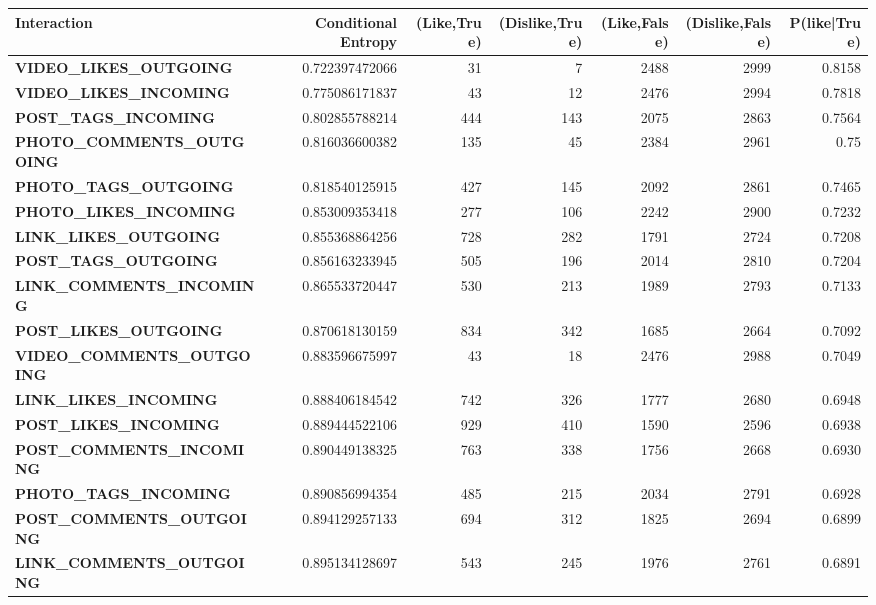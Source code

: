 \begin{table}
	\centering
	\begin{tabular}{| >{\small}l | >{\small}r | >{\small}r | >{\small}r | >{\small}r | >{\small}r | >{\small}r |}
	\hline
	Interaction & Conditional Entropy & (Like,True) & (Dislike,True) & (Like,False) & (Dislike,False)  & P(like|True)\\
	\hline
	\textbf{VIDEO\_LIKES\_OUTGOING} & 0.722397472066 & 31 & 7 & 2488 & 2999 & 0.8158\\
	\hline
	\textbf{VIDEO\_LIKES\_INCOMING} & 0.775086171837 & 43 & 12 & 2476 & 2994 & 0.7818\\
	\hline
	\textbf{POST\_TAGS\_INCOMING} & 0.802855788214 & 444 & 143 & 2075 & 2863 & 0.7564\\
	\hline
	\textbf{PHOTO\_COMMENTS\_OUTGOING} & 0.816036600382 & 135 & 45 & 2384 & 2961 & 0.75\\
	\hline
	\textbf{PHOTO\_TAGS\_OUTGOING} & 0.818540125915 & 427 & 145 & 2092 & 2861 & 0.7465\\
	\hline
	\textbf{PHOTO\_LIKES\_INCOMING} & 0.853009353418 & 277 & 106 & 2242 & 2900 & 0.7232\\
	\hline
	\textbf{LINK\_LIKES\_OUTGOING} & 0.855368864256 & 728 & 282 & 1791 & 2724 & 0.7208\\
	\hline
	\textbf{POST\_TAGS\_OUTGOING} & 0.856163233945 & 505 & 196 & 2014 & 2810 & 0.7204\\
	\hline
	\textbf{LINK\_COMMENTS\_INCOMING} & 0.865533720447 & 530 & 213 & 1989 & 2793 & 0.7133 \\
	\hline
	\textbf{POST\_LIKES\_OUTGOING} & 0.870618130159 & 834 & 342 & 1685 & 2664 & 0.7092\\
	\hline
	\textbf{VIDEO\_COMMENTS\_OUTGOING} & 0.883596675997 & 43 & 18 & 2476 & 2988 & 0.7049\\
	\hline
	\textbf{LINK\_LIKES\_INCOMING} & 0.888406184542 & 742 & 326 & 1777 & 2680 & 0.6948\\
	\hline
	\textbf{POST\_LIKES\_INCOMING} & 0.889444522106 & 929 & 410 & 1590 & 2596 & 0.6938\\
	\hline
	\textbf{POST\_COMMENTS\_INCOMING} & 0.890449138325 & 763 & 338 & 1756 & 2668 & 0.6930\\
	\hline
	\textbf{PHOTO\_TAGS\_INCOMING} & 0.890856994354 & 485 & 215 & 2034 & 2791 & 0.6928\\
	\hline
	\textbf{POST\_COMMENTS\_OUTGOING} & 0.894129257133 & 694 & 312 & 1825 & 2694 & 0.6899\\
	\hline
	\textbf{LINK\_COMMENTS\_OUTGOING} & 0.895134128697 & 543 & 245 & 1976 & 2761 & 0.6891\\

\end{tabular}
\end{table}
